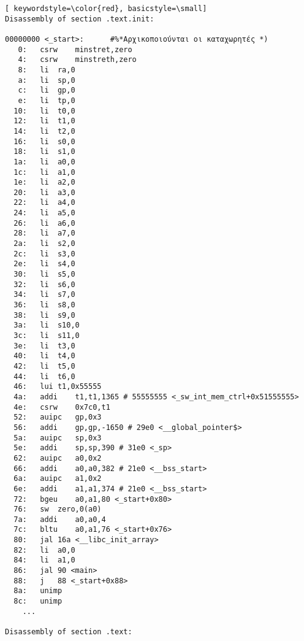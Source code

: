 \documentclass[a4paper]{article}
\begin{document}
\begin{lstlisting}[ keywordstyle=\color{red}, basicstyle=\small]
Disassembly of section .text.init:

00000000 <_start>:		#%*Αρχικοποιούνται οι καταχωρητές *)
   0:	csrw	minstret,zero
   4:	csrw	minstreth,zero
   8:	li	ra,0
   a:	li	sp,0
   c:	li	gp,0
   e:	li	tp,0
  10:	li	t0,0
  12:	li	t1,0
  14:	li	t2,0
  16:	li	s0,0
  18:	li	s1,0
  1a:	li	a0,0
  1c:	li	a1,0
  1e:	li	a2,0
  20:	li	a3,0
  22:	li	a4,0
  24:	li	a5,0
  26:	li	a6,0
  28:	li	a7,0
  2a:	li	s2,0
  2c:	li	s3,0
  2e:	li	s4,0
  30:	li	s5,0
  32:	li	s6,0
  34:	li	s7,0
  36:	li	s8,0
  38:	li	s9,0
  3a:	li	s10,0
  3c:	li	s11,0
  3e:	li	t3,0
  40:	li	t4,0
  42:	li	t5,0
  44:	li	t6,0
  46:	lui	t1,0x55555
  4a:	addi	t1,t1,1365 # 55555555 <_sw_int_mem_ctrl+0x51555555>
  4e:	csrw	0x7c0,t1
  52:	auipc	gp,0x3
  56:	addi	gp,gp,-1650 # 29e0 <__global_pointer$>
  5a:	auipc	sp,0x3
  5e:	addi	sp,sp,390 # 31e0 <_sp>
  62:	auipc	a0,0x2
  66:	addi	a0,a0,382 # 21e0 <__bss_start>
  6a:	auipc	a1,0x2
  6e:	addi	a1,a1,374 # 21e0 <__bss_start>
  72:	bgeu	a0,a1,80 <_start+0x80>
  76:	sw	zero,0(a0)
  7a:	addi	a0,a0,4
  7c:	bltu	a0,a1,76 <_start+0x76>
  80:	jal	16a <__libc_init_array>
  82:	li	a0,0
  84:	li	a1,0
  86:	jal	90 <main>
  88:	j	88 <_start+0x88>
  8a:	unimp
  8c:	unimp
	...

Disassembly of section .text:


\end{lstlisting}
\end{document}

